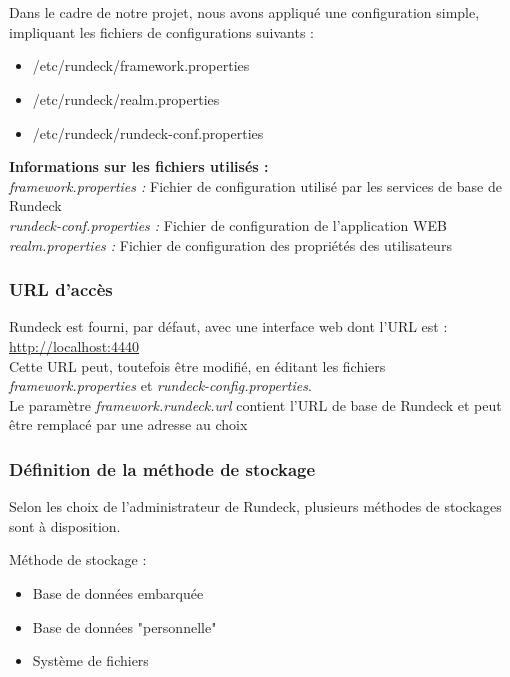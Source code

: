 \documentclass[12pt]{article}
\begin{document}
\\
\vspace{0.5cm}
\\
Dans le cadre de notre projet, nous avons appliqué une configuration simple, impliquant les fichiers de configurations suivants :
\begin{itemize}
    \item /etc/rundeck/framework.properties
    \item /etc/rundeck/realm.properties
    \item /etc/rundeck/rundeck-conf.properties
\end{itemize}
\vspace{0.5cm}
\textbf{Informations sur les fichiers utilisés :}
\\
\textit{framework.properties :} Fichier de configuration utilisé par les services de base de Rundeck
\\
\textit{rundeck-conf.properties :} Fichier de configuration de l'application WEB
\\
\textit{realm.properties :} Fichier de configuration des propriétés des utilisateurs

\subsubsection{URL d'accès}
Rundeck est fourni, par défaut, avec une interface web dont l'URL est : 
\\
\underline{\url{http://localhost:4440}}
\vspace{0.2cm}
\\
Cette URL peut, toutefois être modifié, en éditant les fichiers \textit{framework.properties} et \textit{rundeck-config.properties}.
\\
Le paramètre \textit{framework.rundeck.url} contient l'URL de base de Rundeck et peut être remplacé par une adresse au choix

\subsubsection{Définition de la méthode de stockage}

Selon les choix de l'administrateur de Rundeck, plusieurs méthodes de stockages sont à disposition.

Méthode de stockage :
\begin{itemize}
    \item Base de données embarquée
    \item Base de données "personnelle"
    \item Système de fichiers
\end{itemize}
\end{document}
